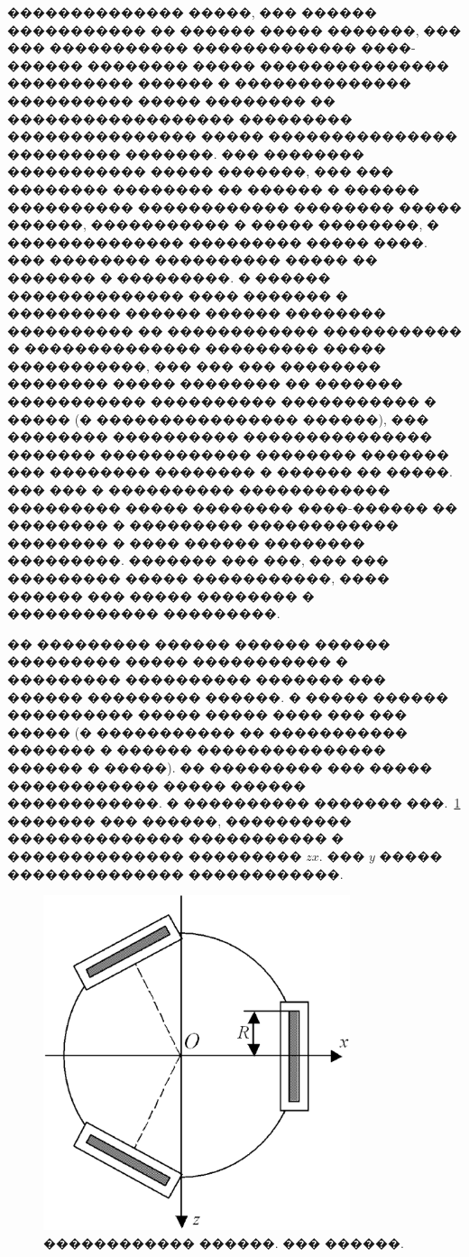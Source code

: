 \documentclass[12pt,a4paper]{article}
\begin{document}
�������������� �����, ��� ������ ����������� �� ������ ����� �������, ��� ��� 
����������� ������������� ����-������ �������� ����� ��������������� ���������� 
������ � �������������� ���������� ����� �������� �� ������������������ 
��������� ��������������� ����� ��������������� ��������� �������. ��� �������� 
����������� ����� �������, ��� ��� �������� �������� �� ������ � ������ 
���������� ������������ �������� ����� ������, ����������� � ����� ��������, � 
�������������� ��������� ����� ����. ��� �������� ���������� ����� �� ������� � 
���������. � ������ �������������� ���� ������� � ��������� ������ ������ 
�������� ���������� �� ������������ ����������� � �������������� ��������� 
����� �����������, ��� ��� ��� �������� �������� ����� �������� �� ������� 
����������� ���������� ����������� � ����� (� ���������������� ������), ��� 
�������� ���������� ��������������� ������� ������������ �������� ������� ��� 
�������� �������� � ������ �� �����. ��� ��� � ���������� ������������ 
��������� ����� �������� ����-������ �� �������� � ��������� ������������ 
�������� � ���� ������ �������� ���������. ������� ��� ���, ��� ��� ��������� 
����� �����������, ���� ������ ��� ����� �������� � ������������ ���������.

�� ��������� ������ ������ ������ ��������� ����� ����������� � ��������� 
���������� ������� ��� ������ ��������� ������. � ����� ������ ���������� ����� 
����� ���� ��� ��� ����� (� ����������� �� ����������� ������� � ������ 
��������������� ������ � �����). �� ��������� ��� ����� ������������ ����� 
������ ������������. � ���������� ������� ���.~\ref{Vehicle} ������� ��� 
������, ���������� �������������� ����������� � �������������� ��������� $zx$. 
��� $y$ ����� �������������� ������������.
\begin{figure}[htb]
\centering\includegraphics[width=9cm]{Vehicle.eps}
\caption{������������ ������. ��� ������.}
\label{Vehicle}
\end{figure}
\end{document}
